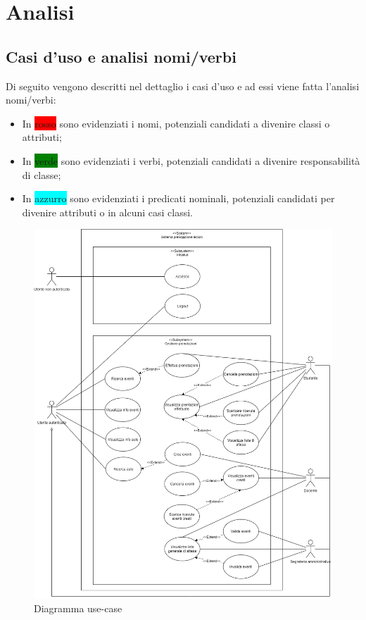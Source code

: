 \documentclass[11pt]{article}
\begin{document}
\newpage

\section{Analisi}

\subsection{Casi d'uso e analisi nomi/verbi}
Di seguito vengono descritti nel dettaglio i casi d'uso e ad essi viene fatta l'analisi nomi/verbi:
\begin{itemize}
\itemsep0em
\item In \colorbox{red}{rosso} sono evidenziati i nomi, potenziali candidati a divenire classi o attributi;
\item In \colorbox{green}{verde} sono evidenziati i verbi, potenziali candidati a divenire responsabilità di classe;
\item In \colorbox{cyan}{azzurro} sono evidenziati i predicati nominali, potenziali candidati per divenire attributi o in alcuni casi classi.
\end{itemize}

\begin{figure}[H]
\centering
\includegraphics[width=1\textwidth]{Diagramma use-case.png}
\caption{Diagramma use-case}
\end{figure}
\end{document}
